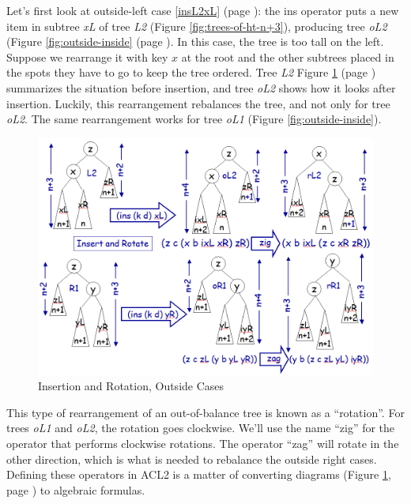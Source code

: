 Let's first look at outside-left case \ref{insL2xL} (page \pageref{insL2xL}):
the ins operator puts a new item in subtree \emph{xL} of tree \emph{L2}
(Figure \ref{fig:trees-of-ht-n+3}), producing
tree \emph{oL2}
(Figure \ref{fig:outside-inside} (page \pageref{fig:outside-inside}).
In this case, the tree is too tall on the left.
Suppose we rearrange it with key $x$ at the root
and the other subtrees placed in the spots they have to go
to keep the tree ordered.
Tree \emph{L2} Figure \ref{fig:zig-and-zag} (page \pageref{fig:zig-and-zag})
summarizes the situation before insertion,
and tree \emph{oL2} shows how it looks after insertion.
Luckily, this rearrangement rebalances the tree,
and not only for tree \emph{oL2}.
The same rearrangement works for tree \emph{oL1}
(Figure \ref{fig:outside-inside}).

\begin{figure}
\begin{center}
\includegraphics[scale=0.5]{images/zig-and-zag.png}
\end{center}
\caption{Insertion and Rotation, Outside Cases}
\label{fig:zig-and-zag}
\end{figure}

This type of rearrangement of an out-of-balance tree is known as a ``rotation''.
For trees \emph{oL1} and \emph{oL2}, the rotation goes clockwise.
We'll use the name ``zig'' for the operator
that performs clockwise rotations.
The operator ``zag'' will rotate in the other direction,
which is what is needed to rebalance the outside right cases.
Defining these operators in ACL2 is a matter of
converting diagrams
(Figure \ref{fig:zig-and-zag}, page \pageref{fig:zig-and-zag})
to algebraic formulas.


